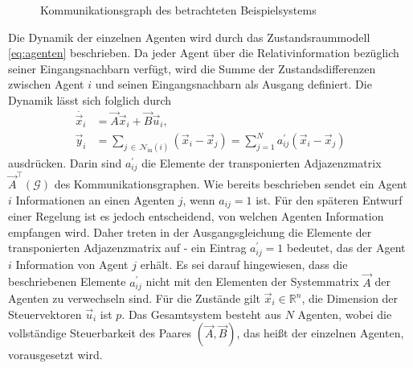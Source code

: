 \begin{figure} [tbh]
	\centering
		
	\caption{Kommunikationsgraph des betrachteten Beispielsystems}
	\label{fig:bspkommunikationsgraph}
\end{figure}

Die Dynamik der einzelnen Agenten wird durch das Zustandsraummodell \eqref{eq:agenten} beschrieben. Da jeder Agent über die Relativinformation bezüglich seiner Eingangsnachbarn verfügt, wird die Summe der Zustandsdifferenzen zwischen Agent $i$ und seinen Eingangsnachbarn als Ausgang definiert. Die Dynamik lässt sich folglich durch
\begin{subequations} \label{eq:agenten}
	\begin{align}
		\dot{\vec{x}_i} &= \vec{A}\vec{x}_i + \vec{B}\vec{u}_i, \label{eq:agenten 1} \\
		\vec{y}_i &= \sum_{j \, \in \, \mathcal N_\text{in}(i)}^{}{\left(\vec{x}_i - \vec{x}_j\right)} = \sum_{j=1}^{N}{a_{ij}^{'}\left(\vec{x}_i - \vec{x}_j\right)} \label{eq:agenten 2}
	\end{align}
\end{subequations}
ausdrücken. Darin sind $a_{ij}^{'}$ die Elemente der transponierten Adjazenzmatrix $\vec{A}^\top\left(\mathcal G\right)$ des Kommunikationsgraphen. Wie bereits beschrieben sendet ein Agent $i$ Informationen an einen Agenten $j$, wenn $a_{ij}=1$ ist. Für den späteren Entwurf einer Regelung ist es jedoch entscheidend, von welchen Agenten Information empfangen wird. Daher treten in der Ausgangsgleichung die Elemente der transponierten Adjazenzmatrix auf - ein Eintrag $a_{ij}^{'}=1$ bedeutet, das der Agent $i$ Information von Agent $j$ erhält. Es sei darauf hingewiesen, dass die beschriebenen Elemente $a_{ij}^{'}$ nicht mit den Elementen der Systemmatrix $\vec{A}$ der Agenten zu verwechseln sind. Für die Zustände gilt $\vec{x}_i \in \mathbb{R}^n$, die Dimension der Steuervektoren $\vec{u}_i$ ist $p$. Das Gesamtsystem besteht aus $N$ Agenten, wobei die vollständige Steuerbarkeit des Paares $(\vec{A},\vec{B})$, das heißt der einzelnen Agenten, vorausgesetzt wird. 


